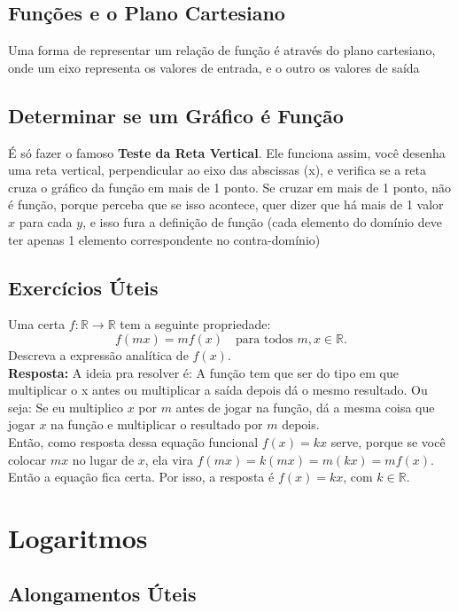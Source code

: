 \documentclass{article}
\begin{document}
\subsection{Funções e o Plano Cartesiano}
Uma forma de representar um relação de função é através do plano cartesiano, onde um eixo representa os valores de entrada, e o outro os valores de saída

\subsection{Determinar se um Gráfico é Função}
É só fazer o famoso \textbf{Teste da Reta Vertical}. Ele funciona assim, você desenha uma reta vertical, perpendicular ao eixo das abscissas (x), e verifica se a reta cruza o gráfico da função em mais de 1 ponto. Se cruzar em mais de 1 ponto, não é função, porque perceba que se isso acontece, quer dizer que há mais de 1 valor $x$ para cada $y$, e isso fura a definição de função (cada elemento do domínio deve ter apenas 1 elemento correspondente no contra-domínio)

\subsection{Exercícios Úteis}
Uma certa \( f : \mathbb{R} \to \mathbb{R} \) tem a seguinte propriedade:
\[
f(mx) = mf(x) \quad \text{para todos } m, x \in \mathbb{R}.
\]
Descreva a expressão analítica de \( f(x) \).
\\[5pt]
\textbf{Resposta:} A ideia pra resolver é: A função tem que ser do tipo em que multiplicar o x antes ou multiplicar a saída depois dá o mesmo resultado. Ou seja: Se eu multiplico $x$ por $m$ antes de jogar na função, dá a mesma coisa que jogar $x$ na função e multiplicar o resultado por $m$ depois.
\\[5pt]
Então, como resposta dessa equação funcional \( f(x) = kx \) serve, porque se você colocar \( mx \) no lugar de \( x \), ela vira \( f(mx) = k(mx) = m(kx) = mf(x) \). Então a equação fica certa. Por isso, a resposta é \( f(x) = kx \), com \( k \in \mathbb{R} \).

\section{Logaritmos}

\subsection{Alongamentos Úteis}
\end{document}
